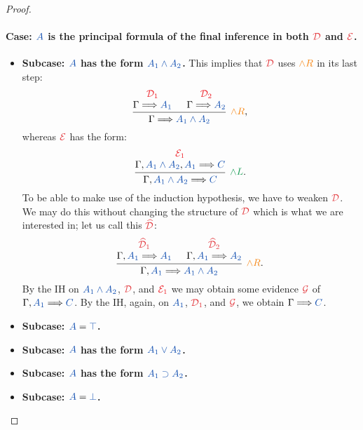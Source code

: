\begin{proof}
  \paragraph{Case: $\prp{A}$ is the principal formula of the final inference
  in both $\drv{D}$ and $\drv{E}$.}
  \begin{itemize}
    \item \textbf{Subcase: $\prp{A}$ has the form $\prp{A_1 \land A_2}$.}
    This implies that $\drv{D}$ uses $\rightRule{\land R}$ in its last step:
    \[
      \begin{prooftree}
        \hypo{{\color{Red} \mathcal{D}_1}}
        \infer[no rule]1{\sequent{A_1}}
        \hypo{{\color{Red} \mathcal{D}_2}}
        \infer[no rule]1{\sequent{A_2}}
        \infer2[$\rightRule{\land R}$,]{\sequent{A_1 \land A_2}}
      \end{prooftree}
    \]
    whereas $\drv{E}$ has the form:
    \[
      \begin{prooftree}
        \hypo{{\color{Red} \mathcal{E}_1}}
        \infer[no rule]1{\sequent[A_1 \land A_2][A_1]{C}}
        \infer1[$\leftRule{\land L}$.]{\sequent[A_1 \land A_2]{C}}
      \end{prooftree}
    \]
    To be able to make use of the induction hypothesis, we have to weaken
    $\drv{D}$. We may do this without changing the structure of $\drv{D}$ which
    is what we are interested in; let us call this $\drv{\widehat{D}}$:
    \[
      \begin{prooftree}
        \hypo{\drv{\widehat{D}}[1]}
        \infer[no rule]1{\sequent[A_1]{A_1}}
        \hypo{\drv{\widehat{D}}[2]}
        \infer[no rule]1{\sequent[A_1]{A_2}}
        \infer2[$\rightRule{\land R}$.]{\sequent[A_1]{A_1 \land A_2}}
      \end{prooftree}
    \]
    By the IH on $\prp{A_1 \land A_2}$, $\drv{D}$, and
    ${\color{Red} \mathcal{E}_1}$ we may obtain some evidence $\drv{G}$
    of $\sequent[A_1]{C}$. By the IH, again, on $\prp{A_1}$, $\drv{D}[1]$,
    and $\drv{G}$, we obtain $\sequent{C}$.
    \item \textbf{Subcase: $\prp{A} = \prp{\top}$.}
    \item \textbf{Subcase: $\prp{A}$ has the form $\prp{A_1 \lor A_2}$.}
    \item \textbf{Subcase: $\prp{A}$ has the form $\prp{A_1 \supset A_2}$.}
    \item \textbf{Subcase: $\prp{A} = \prp{\bot}$.}
  \end{itemize}


\end{proof}
